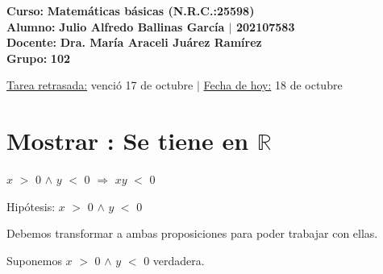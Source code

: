 \documentclass[12pt]{article}
\begin{document}
    \large{\bf{\textsf{Curso:}}} {\bfseries{{\textcolor{brightturquoise}{Matemáticas básicas \bfseries{(N.R.C.:25598)}}}}} \\
    \large{\bf{\textsf{Alumno:}}} {\bfseries{{\textcolor{prussianblue}{Julio Alfredo Ballinas García {\large{{$\mid$}}} 202107583}}}}  \\
    \large{\bf{\textsf{Docente:}}} {\bfseries{{\textcolor{wisteria}{Dra. María Araceli Juárez Ramírez}}}}\\
    \large{\bf{\textsf{Grupo:}}} {\bfseries{{\textcolor{verde_manzana}{102}}}}\\

\vfill
    
\begin{center} 

    {\small{\textsf{\underline{Tarea retrasada:} venció 17 de octubre {}} {\LARGE{ $\mid$ }}\textsf{{\underline{Fecha de hoy:}} 18 de octubre}}}
    
\end{center}

\newpage


\section{\textsf{Mostrar {} {}: Se tiene en $\mathbb{R}$ }} \vspace{.5cm}

{\LARGE{{} \hspace{.1cm} $x$ $>$ $0$ $\wedge$ $y$ $<$ $0$ $\Longrightarrow$ $xy$ $<$ $0$}} \vspace{.5cm}


{}  \vspace{0.5cm}

{} \vspace{0.5cm} 

{\textcolor{palatinateblue}{Hipótesis:} {\Large{$x$ $>$ $0$ $\wedge$ $y$ $<$ $0$}}} \vspace{0.5cm}

{\textcolor{palatinateblue}{Debemos transformar a ambas proposiciones para poder trabajar con ellas.}} \vspace{0.5cm}

{\textcolor{palatinateblue}{Suponemos}} {\Large{$x$ $>$ $0$ $\wedge$ $y$ $<$ $0$ }} {\textcolor{pakistangreen}{verdadera.}} \vspace{0.5cm}
\end{document}
